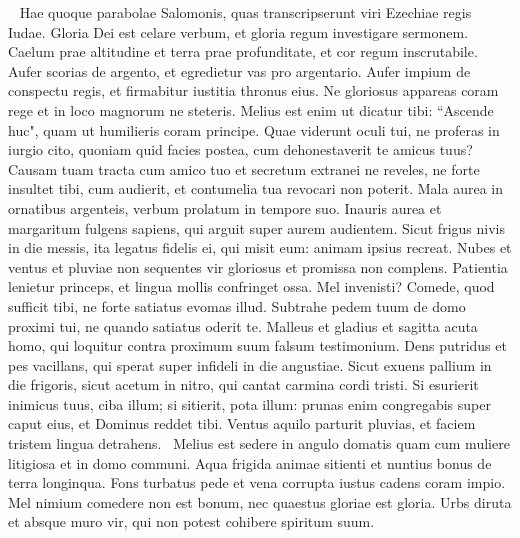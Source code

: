 \begin{biblechapter}   
\verse Hae quoque parabolae Salomonis, quas transcripserunt viri Ezechiae regis Iudae. 
\verse Gloria Dei est celare verbum, et gloria regum investigare sermonem. 
\verse Caelum prae altitudine et terra prae profunditate, et cor regum inscrutabile. 
\verse Aufer scorias de argento, et egredietur vas pro argentario. 
\verse Aufer impium de conspectu regis, et firmabitur iustitia thronus eius. 
\verse Ne gloriosus appareas coram rege et in loco magnorum ne steteris. 
\verse Melius est enim ut dicatur tibi: “Ascende huc", quam ut humilieris coram principe. 
\verse Quae viderunt oculi tui, ne proferas in iurgio cito, quoniam quid facies postea, cum dehonestaverit te amicus tuus? 
\verse Causam tuam tracta cum amico tuo et secretum extranei ne reveles, 
\verse ne forte insultet tibi, cum audierit, et contumelia tua revocari non poterit. 
\verse Mala aurea in ornatibus argenteis, verbum prolatum in tempore suo. 
\verse Inauris aurea et margaritum fulgens sapiens, qui arguit super aurem audientem. 
\verse Sicut frigus nivis in die messis, ita legatus fidelis ei, qui misit eum: animam ipsius recreat. 
\verse Nubes et ventus et pluviae non sequentes vir gloriosus et promissa non complens. 
\verse Patientia lenietur princeps, et lingua mollis confringet ossa. 
\verse Mel invenisti? Comede, quod sufficit tibi, ne forte satiatus evomas illud. 
\verse Subtrahe pedem tuum de domo proximi tui, ne quando satiatus oderit te. 
\verse Malleus et gladius et sagitta acuta homo, qui loquitur contra proximum suum falsum testimonium. 
\verse Dens putridus et pes vacillans, qui sperat super infideli in die angustiae. 
\verse Sicut exuens pallium in die frigoris, sicut acetum in nitro, qui cantat carmina cordi tristi. 
\verse Si esurierit inimicus tuus, ciba illum; si sitierit, pota illum: 
\verse prunas enim congregabis super caput eius, et Dominus reddet tibi. 
\verse Ventus aquilo parturit pluvias, et faciem tristem lingua detrahens.  
\verse Melius est sedere in angulo domatis quam cum muliere litigiosa et in domo communi. 
\verse Aqua frigida animae sitienti et nuntius bonus de terra longinqua. 
\verse Fons turbatus pede et vena corrupta iustus cadens coram impio. 
\verse Mel nimium comedere non est bonum, nec quaestus gloriae est gloria. 
\verse Urbs diruta et absque muro vir, qui non potest cohibere spiritum suum. 
\end{biblechapter}

